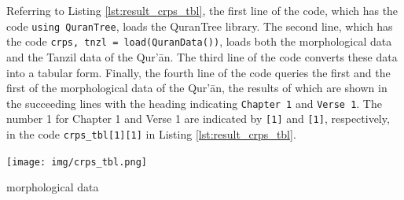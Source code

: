 Referring to Listing \ref{lst:result_crps_tbl}, the first line of the code, which has the code \texttt{using QuranTree}, loads the QuranTree library. The second line, which has the code \texttt{crps, tnzl = load(QuranData())}, loads both the morphological data and the Tanzil data of the Qur'\=an. The third line of the code converts these data into a tabular form. Finally, the fourth line of the code queries the first   and the first   of the morphological data of the Qur'\=an, the results of which are shown in the succeeding lines with the heading indicating \texttt{Chapter 1} and \texttt{Verse 1}. The number 1 for Chapter 1 and Verse 1 are indicated by \texttt{[1]} and \texttt{[1]}, respectively, in the code \verb|crps_tbl[1][1]| in Listing \ref{lst:result_crps_tbl}.

\begin{listing2}[!t]
    \centering
    \texttt{[image: img/crps\_tbl.png]}
    \caption{  morphological data}
    \label{lst:result_crps_tbl}
\end{listing2}


